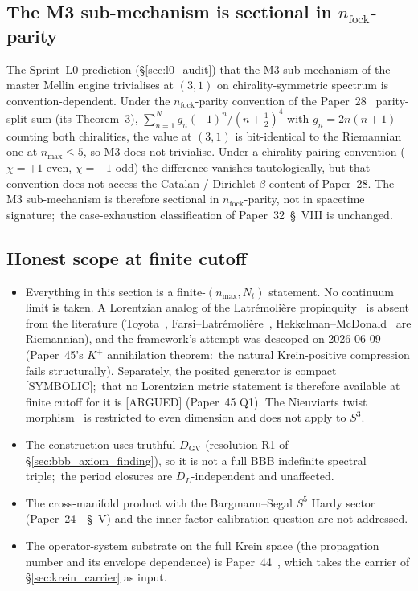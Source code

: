 \documentclass[11pt,a4paper]{article}
\theoremstyle{plain}
\theoremstyle{definition}
\newcommand{\nmax}{n_{\max}}
\newcommand{\sthree}{S^{3}}
\newcommand{\Nt}{N_t}
\newcommand{\DGV}{D_{\mathrm{GV}}}
\newcommand{\DL}{D_{L}}
\begin{document}
\subsection{The M3 sub-mechanism is sectional in $n_{\mathrm{fock}}$-parity}
\label{sec:m3_convention}

The Sprint~L0 prediction (\S\ref{sec:l0_audit}) that the M3
sub-mechanism of the master Mellin engine trivialises at $(3, 1)$ on
chirality-symmetric spectrum is convention-dependent.  Under the
$n_{\mathrm{fock}}$-parity convention of the Paper~28~\cite{paper28}
parity-split sum (its Theorem~3),
$\sum_{n=1}^{N} g_n(-1)^n/(n+\tfrac12)^4$ with $g_n = 2n(n+1)$ counting
both chiralities, the value at $(3, 1)$ is bit-identical to the
Riemannian one at $\nmax \le 5$, so M3 does not trivialise.  Under a
chirality-pairing convention ($\chi = +1$ even, $\chi = -1$ odd) the
difference vanishes tautologically, but that convention does not access
the Catalan / Dirichlet-$\beta$ content of Paper~28.  The M3 sub-mechanism
is therefore sectional in $n_{\mathrm{fock}}$-parity, not in spacetime
signature;\ the case-exhaustion classification of Paper~32~\S~VIII is
unchanged.

\subsection{Honest scope at finite cutoff}
\label{sec:lorentzian_closure_scope}

\begin{itemize}\setlength{\itemsep}{2pt}
\item Everything in this section is a finite-$(\nmax, \Nt)$ statement.
No continuum limit is taken.  A Lorentzian analog of the
Latr\'emoli\`ere propinquity~\cite{latremoliere2018,
latremoliere_metric_st_2017} is absent from the literature
(Toyota~\cite{toyota2023}, Farsi--Latr\'emoli\`ere~\cite{farsi_latremoliere2024,
farsi_latremoliere2025}, Hekkelman--McDonald~\cite{hekkelman_mcdonald2024b}
are Riemannian), and the framework's attempt was descoped on 2026-06-09
(Paper~45's $K^+$ annihilation theorem:\ the natural Krein-positive
compression fails structurally).  Separately, the posited
generator is compact [SYMBOLIC];\ that no Lorentzian metric statement is
therefore available at finite cutoff for it is [ARGUED] (Paper~45 Q1).  The
Nieuviarts twist morphism~\cite{nieuviarts2025a, nieuviarts2025b_proceedings}
is restricted to even dimension and does not apply to $\sthree$.
\item The construction uses truthful $\DGV$ (resolution R1 of
\S\ref{sec:bbb_axiom_finding}), so it is not a full BBB indefinite
spectral triple;\ the period closures are $\DL$-independent and
unaffected.
\item The cross-manifold product with the Bargmann--Segal $S^5$ Hardy
sector (Paper~24~\cite{paper24}~\S~V) and the inner-factor calibration
question are not addressed.
\item The operator-system substrate on the full Krein space (the
propagation number and its envelope dependence) is
Paper~44~\cite{paper44}, which takes the carrier of
\S\ref{sec:krein_carrier} as input.
\end{itemize}
\end{document}
